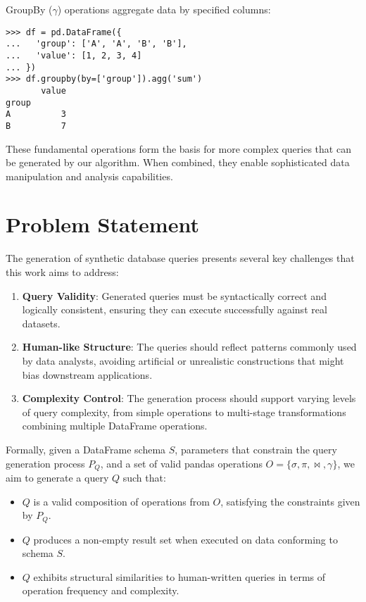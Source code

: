 \documentclass[10pt, twocolumn]{article}
\begin{document}
\noindent
GroupBy ($\gamma$) operations aggregate data by specified columns:

\begin{verbatim}
>>> df = pd.DataFrame({
...   'group': ['A', 'A', 'B', 'B'],
...   'value': [1, 2, 3, 4]
... })
>>> df.groupby(by=['group']).agg('sum')
       value
group
A          3
B          7
\end{verbatim}

\noindent
These fundamental operations form the basis for more complex queries that can be generated by our algorithm. When combined, they enable sophisticated data manipulation and analysis capabilities.

\section{Problem Statement}
The generation of synthetic database queries presents several
key challenges that this work aims to address:

\begin{enumerate}
  \item \textbf{Query Validity}: Generated queries must be
    syntactically correct and logically consistent, ensuring
    they can execute successfully against real datasets.

  \item \textbf{Human-like Structure}: The queries should
    reflect patterns commonly used by data analysts, avoiding
    artificial or unrealistic constructions that might bias
    downstream applications.

  \item \textbf{Complexity Control}: The generation process
    should support varying levels of query complexity, from
    simple operations to multi-stage transformations combining
    multiple DataFrame operations.
\end{enumerate}

\noindent
Formally, given a DataFrame schema $S$, parameters that constrain the query generation process $P_{Q}$, and a set of valid
pandas operations $O = \{\sigma, \pi, \bowtie, \gamma\}$, we
aim to generate a query $Q$ such that:

\begin{itemize}
  \item $Q$ is a valid composition of operations from $O$, satisfying the constraints given by $P_{Q}$.
  \item $Q$ produces a non-empty result set when executed on data conforming to schema $S$.
  \item $Q$ exhibits structural similarities to human-written queries in terms of operation frequency and complexity.
\end{itemize}
\end{document}
